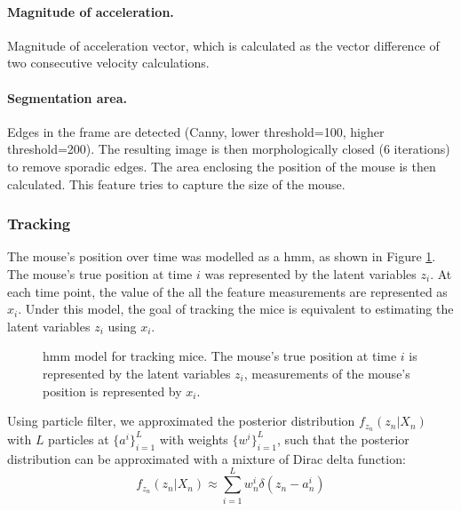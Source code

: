 \paragraph{Magnitude of acceleration.} Magnitude of acceleration vector, which is calculated as the vector difference of two consecutive velocity calculations. 

\paragraph{Segmentation area.} Edges in the frame are detected (Canny, lower threshold=100, higher threshold=200). The resulting image is then morphologically closed (6 iterations) to remove sporadic edges. The area enclosing the position of the mouse is then calculated. This feature tries to capture the size of the mouse.

\subsubsection{Tracking}

The mouse's position over time was modelled as a \gls{hmm}, as shown in Figure \ref{f.ad.hmm}. The mouse's true position at time $i$ was represented by the latent variables $z_i$. At each time point, the value of the all the feature measurements are represented as $x_i$. Under this model, the goal of tracking the mice is equivalent to estimating the latent variables $z_i$ using $x_i$. 

\begin{figure}[h]
    
    \caption[\gls{hmm} model for tracking mice.]{\gls{hmm} model for tracking mice. The mouse's true position at time $i$ is represented by the latent variables $z_i$, measurements of the mouse's position is represented by $x_i$. \label{f.ad.hmm}}
\end{figure}

Using particle filter, we approximated the posterior distribution $f_{z_n}(z_n|X_n)$ with $L$ particles at $\{a^i\}_{i=1}^L$ with weights $\{w^i\}_{i=1}^L$, such that the posterior distribution can be approximated with a mixture of Dirac delta function: 
\begin{equation} \label{zn_approx}
    f_{z_n}(z_n|X_n) \approx \sum_{i=1}^Lw_n^i\delta(z_n - a_n^i)
\end{equation}

